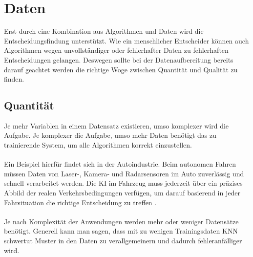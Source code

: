 \documentclass[12pt,oneside,a4paper,parskip]{scrbook}
\begin{document}
\section{Daten}
\label{section:Data}
Erst durch eine Kombination aus Algorithmen und Daten wird die Entscheidungsfindung unterstützt. Wie ein menschlicher Entscheider können auch Algorithmen wegen unvollständiger oder fehlerhafter Daten zu fehlerhaften Entscheidungen gelangen.
Deswegen sollte bei der Datenaufbereitung bereits darauf geachtet werden die richtige Woge zwischen Quantität und Qualität zu finden.

\subsection{Quantität}
Je mehr Variablen in einem Datensatz existieren, umso komplexer wird die Aufgabe. Je komplexer die Aufgabe, umso mehr Daten benötigt das zu trainierende System, um alle Algorithmen korrekt einzustellen.
\\\\
Ein Beispiel hierfür findet sich in der Autoindustrie. Beim autonomen Fahren müssen Daten von Laser-, Kamera- und Radarsensoren im Auto zuverlässig und schnell verarbeitet werden. Die KI im Fahrzeug muss jederzeit über ein präzises Abbild der realen Verkehrsbedingungen verfügen, um darauf basierend in jeder Fahrsituation die richtige Entscheidung zu treffen \cite{autonomesFahren}.
\\\\
Je nach Komplexität der Anwendungen werden mehr oder weniger Datensätze benötigt. Generell kann man sagen, dass mit zu wenigen Trainingsdaten KNN schwertut Muster in den Daten zu verallgemeinern und dadurch fehleranfälliger wird. 
\end{document}
